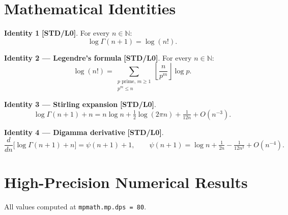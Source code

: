 \documentclass[12pt,a4paper]{article}
\theoremstyle{definition}
\theoremstyle{remark}
\newcommand{\STDLZ}{\textcolor{gray!70!black}{\textbf{[STD/L0]}}}
\begin{document}
\section{Mathematical Identities}
\label{sec:identities}

\begin{resultbox}
\textbf{Identity 1} \STDLZ{}.  For every $n \in \mathbb{N}$:
\begin{equation}
  \log\Gamma(n+1) = \log(n!).
\end{equation}

\textbf{Identity 2 — Legendre's formula} \STDLZ{}.  For every $n \in \mathbb{N}$:
\begin{equation}
  \log(n!) = \sum_{\substack{p \text{ prime},\, m \geq 1 \\ p^m \leq n}}
             \left\lfloor \frac{n}{p^m} \right\rfloor \log p.
  \label{eq:legendre}
\end{equation}

\textbf{Identity 3 — Stirling expansion} \STDLZ{}.
\begin{equation}
  \log\Gamma(n+1) + n = n\log n + \tfrac{1}{2}\log(2\pi n) + \tfrac{1}{12n} + O(n^{-3}).
  \label{eq:stirling_refined}
\end{equation}

\textbf{Identity 4 — Digamma derivative} \STDLZ{}.
\begin{equation}
  \frac{d}{dn}\bigl[\log\Gamma(n+1) + n\bigr] = \psi(n+1) + 1,
  \qquad
  \psi(n+1) = \log n + \tfrac{1}{2n} - \tfrac{1}{12n^2} + O(n^{-4}).
  \label{eq:digamma_asymp}
\end{equation}
\end{resultbox}

\section{High-Precision Numerical Results}
\label{sec:numerics}

All values computed at \texttt{mpmath.mp.dps = 80}.
\end{document}
